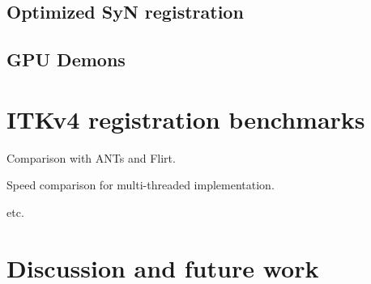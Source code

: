 \documentclass{llncs}
\begin{document}
\subsection{Optimized SyN registration}

\subsection{GPU Demons}

\section{ITKv4 registration benchmarks}

Comparison with ANTs and Flirt.  

Speed comparison for multi-threaded implementation.

etc.
\section{Discussion and future work}
\end{document}
